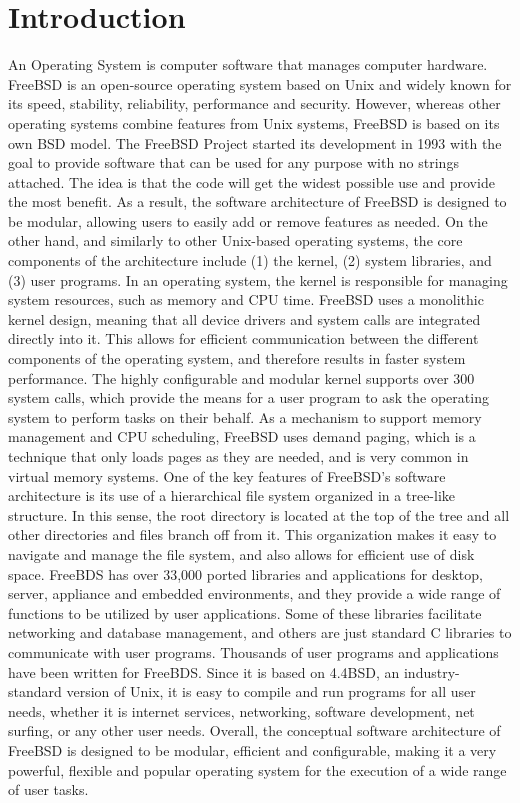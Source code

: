\documentclass[12pt, dvipsnames, a4paper]{article}
\begin{document}
\vfill
\hspace{0pt}
\newpage
\tableofcontents
\clearpage

\section{Introduction}
An Operating System is computer software that manages computer hardware. FreeBSD is an open-source operating system based on Unix and widely known for its speed, stability, reliability, performance and security. However, whereas other operating systems combine features from Unix systems, FreeBSD is based on its own BSD model.
The FreeBSD Project started its development in 1993 with the goal to provide software that can be used for any purpose with no strings attached. The idea is that the code will get the widest possible use and provide the most benefit. As a result, the software architecture of FreeBSD is designed to be modular, allowing users to easily add or remove features as needed. On the other hand, and similarly to other Unix-based operating systems, the core components of the architecture include (1) the kernel, (2) system libraries, and (3) user programs.
In an operating system, the kernel is responsible for managing system resources, such as memory and CPU time. FreeBSD uses a monolithic kernel design, meaning that all device drivers and system calls are integrated directly into it. This allows for efficient communication between the different components of the operating system, and therefore results in faster system performance. The highly configurable and modular kernel supports over 300 system calls, which provide the means for a user program to ask the operating system to perform tasks on their behalf. As a mechanism to support memory management and CPU scheduling, FreeBSD uses demand paging, which is a technique that only loads pages as they are needed, and is very common in virtual memory systems.
One of the key features of FreeBSD's software architecture is its use of a hierarchical file system organized in a tree-like structure. In this sense, the root directory is located at the top of the tree and all other directories and files branch off from it. This organization makes it easy to navigate and manage the file system, and also allows for efficient use of disk space.
FreeBDS has over 33,000 ported libraries and applications for desktop, server, appliance and embedded environments, and they provide a wide range of functions to be utilized by user applications. Some of these libraries facilitate networking and database management, and others are just standard C libraries to communicate with user programs.
Thousands of user programs and applications have been written for FreeBDS. Since it is based on 4.4BSD, an industry-standard version of Unix, it is easy to compile and run programs for all user needs, whether it is internet services, networking, software development, net surfing, or any other user needs.
Overall, the conceptual software architecture of FreeBSD is designed to be modular, efficient and configurable, making it a very powerful, flexible and popular operating system for the execution of a wide range of user tasks.
\end{document}
